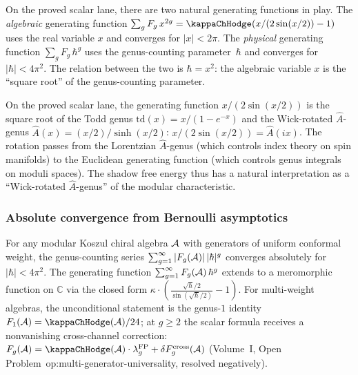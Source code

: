 \begin{remark}
On the proved scalar lane, there are two natural generating functions
in play. The \emph{algebraic} generating function
$\sum_g F_g\,x^{2g} = \kappaChHodge(x/(2\sin(x/2)) - 1)$ uses the real
variable $x$ and converges for $|x| < 2\pi$. The \emph{physical}
generating function $\sum_g F_g\,\hbar^g$ uses the genus-counting
parameter~$\hbar$ and converges for $|\hbar| < 4\pi^2$. The relation
between the two is $\hbar = x^2$: the algebraic variable $x$ is the
``square root'' of the genus-counting parameter.
\end{remark}

\begin{remark}
On the proved scalar lane, the generating function $x/(2\sin(x/2))$ is
the square root of the Todd genus $\mathrm{td}(x) = x/(1-e^{-x})$ and
the Wick-rotated $\hat{A}$-genus $\hat{A}(x) = (x/2)/\sinh(x/2)$:
$x/(2\sin(x/2)) = \hat{A}(ix)$. The rotation passes from the Lorentzian
$\hat{A}$-genus (which controls index theory on spin manifolds) to the
Euclidean generating function (which controls genus integrals on moduli
spaces). The shadow free energy thus has a natural interpretation as a
``Wick-rotated $\hat{A}$-genus'' of the modular characteristic.
\end{remark}

\subsubsection{Absolute convergence from Bernoulli asymptotics}

\begin{theorem}
\label{thm:thqg-I-absolute-convergence}
For any modular Koszul chiral algebra $\mathcal{A}$ with generators of
uniform conformal weight, the
genus-counting series $\sum_{g=1}^{\infty} |F_g(\mathcal{A})|\,|\hbar|^g$
converges absolutely for $|\hbar| < 4\pi^2$. The generating function
$\sum_{g=1}^{\infty} F_g(\mathcal{A})\,\hbar^g$ extends to a meromorphic
function on $\mathbb{C}$ via the closed form
$\kappa \cdot (\frac{\sqrt{\hbar}/2}{\sin(\sqrt{\hbar}/2)} - 1)$.
For multi-weight algebras, the unconditional statement is
the genus-$1$ identity $F_1(\cA) = \kappaChHodge(\cA)/24$;
at $g \geq 2$ the scalar formula receives a nonvanishing
cross-channel correction:
$F_g(\cA) = \kappaChHodge(\cA) \cdot \lambda_g^{\mathrm{FP}}
+ \delta F_g^{\mathrm{cross}}(\cA)$
\textup{(}Volume~I, Open Problem~\textup{op:multi-generator-universality},
resolved negatively\textup{)}.
\end{theorem}

